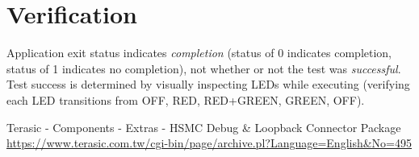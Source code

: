 \section{Verification}
Application exit status indicates \textit{completion} (status of 0 indicates completion, status of 1 indicates no completion), not whether or not the test was \textit{successful}. Test success is determined by visually inspecting LEDs while executing (verifying each LED transitions from OFF, RED, RED+GREEN, GREEN, OFF).

\begin{thebibliography}{1}

 Terasic - Components - Extras - HSMC Debug \& Loopback Connector Package
\url{https://www.terasic.com.tw/cgi-bin/page/archive.pl?Language=English&No=495}

\end{thebibliography}


